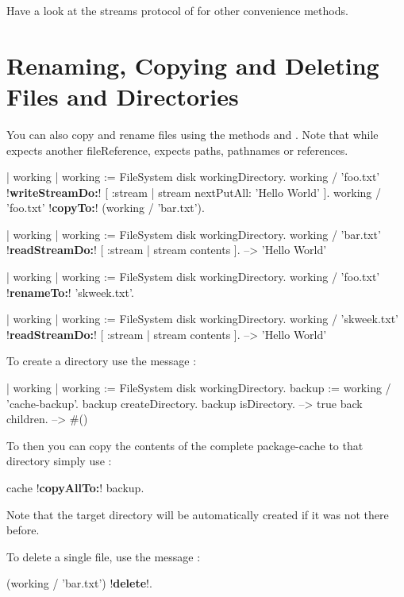 \documentclass[a4paper,10pt,twoside]{book}
\begin{document}
Have a look at the streams protocol of  for other convenience methods.

\section{Renaming, Copying and Deleting Files and Directories}

You can also copy and rename files using the methods  and . Note that while  expects another fileReference,   expects paths, pathnames or references.

\begin{code}{}
| working |
working := FileSystem disk workingDirectory.
working / 'foo.txt' !\textbf{writeStreamDo:}! [ :stream | stream nextPutAll: 'Hello World' ].
working / 'foo.txt' !\textbf{copyTo:}! (working / 'bar.txt').

| working  |
working := FileSystem disk workingDirectory.
working / 'bar.txt' !\textbf{readStreamDo:}! [ :stream | stream contents ].
-->  'Hello World'

| working |
working := FileSystem disk workingDirectory.
working / 'foo.txt' !\textbf{renameTo:}! 'skweek.txt'.

| working  |
working := FileSystem disk workingDirectory.
working / 'skweek.txt' !\textbf{readStreamDo:}! [ :stream | stream contents ]. 
-->  'Hello World'
\end{code} 



To create a directory use the message :

\begin{code}{}
| working  |
working := FileSystem disk workingDirectory.
backup := working / 'cache-backup'.
backup createDirectory.
backup isDirectory.
	--> true
back children.
	--> #()
\end{code} 

To then you can  copy the contents of the complete package-cache to that directory simply use :

\begin{code}{}
cache !\textbf{copyAllTo:}! backup.
\end{code}

Note that the target directory will be automatically created if it was not there before.


To delete a single file, use the message :
\begin{code}{}
 (working / 'bar.txt') !\textbf{delete}!.
\end{code}
\end{document}
